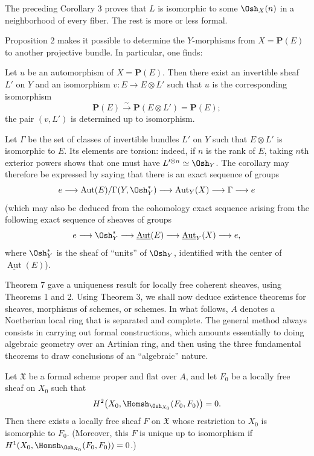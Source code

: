 The preceding Corollary 3 proves that $L$ is isomorphic to some $\Osh_X(n)$ in
a neighborhood of every fiber. The rest is more or less formal.

Proposition 2 makes it possible to determine the $Y$-morphisms from
$X=\mathbf P(E)$ to another projective bundle. In particular, one finds:

 Let $u$ be an automorphism of $X=\mathbf P(E)$. Then
there exist an invertible sheaf $L'$ on $Y$ and an isomorphism
$v:E\longrightarrow E\otimes L'$ such that $u$ is the corresponding
isomorphism
\[
  \mathbf P(E)\xrightarrow{\sim}\mathbf P(E\otimes L')=\mathbf P(E);
\]
the pair $(v,L')$ is determined up to isomorphism.

Let $\Gamma$ be the set of classes of invertible bundles $L'$ on $Y$ such that
$E\otimes L'$ is isomorphic to $E$. Its elements are torsion: indeed, if $n$
is the rank of $E$, taking $n$th exterior powers shows that one must have
$L'^{\otimes n}\simeq\Osh_Y$. The corollary may therefore be expressed by
saying that there is an exact sequence of groups
\[
  e\longrightarrow
  \operatorname{Aut}(E)/\Gamma(Y,\Osh_Y^*)
  \longrightarrow \operatorname{Aut}_Y(X)
  \longrightarrow \Gamma\longrightarrow e
\]
(which may also be deduced from the cohomology exact sequence arising from the
following exact sequence of sheaves of groups
\[
  e\longrightarrow \Osh_Y^*
  \longrightarrow \underline{\operatorname{Aut}}(E)
  \longrightarrow \underline{\operatorname{Aut}}_Y(X)
  \longrightarrow e,
\]
where $\Osh_Y^*$ is the sheaf of “units” of $\Osh_Y$, identified with the
center of $\underline{\operatorname{Aut}}(E)$).


Theorem 7 gave a uniqueness result for locally free coherent sheaves, using
Theorems 1 and 2. Using Theorem 3, we shall now deduce existence theorems for
sheaves, morphisms of schemes, or schemes. In what follows, $A$ denotes a
Noetherian local ring that is separated and complete. The general method
always consists in carrying out formal constructions, which amounts
essentially to doing algebraic geometry over an Artinian ring, and then using
the three fundamental theorems to draw conclusions of an “algebraic” nature.

 Let $\mathfrak X$ be a formal scheme proper and flat
over $A$, and let $F_0$ be a locally free sheaf on $X_0$ such that
\[
  H^2\bigl(X_0,\Homsh_{\Osh_{X_0}}(F_0,F_0)\bigr)=0.
\]
Then there exists a locally free sheaf $F$ on $\mathfrak X$ whose restriction
to $X_0$ is isomorphic to $F_0$. (Moreover, this $F$ is unique up to
isomorphism if
$H^1(X_0,\Homsh_{\Osh_{X_0}}(F_0,F_0))=0$.)


